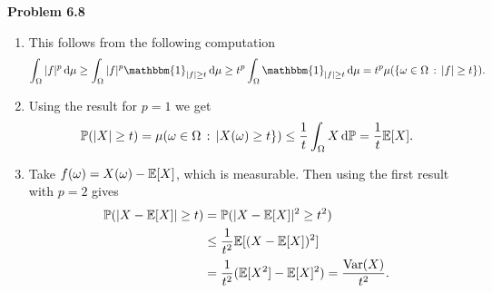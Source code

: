 \bigskip

\textbf{Problem 6.8}

\begin{enumerate}[label=(\alph*)]
\item This follows from the following computation
\[
	\int_\Omega |f|^p \, \dd \mu \ge \int_{\Omega} |f|^p \mathbbm{1}_{|f| \ge t} \, \dd \mu
	\ge t^p \int_\Omega \mathbbm{1}_{|f| \ge t} \, \dd \mu
	= t^p \mu(\{\omega \in \Omega \, : \, |f| \ge t\}).
\]
\item Using the result for $p = 1$ we get
\[
	\mathbb P(|X| \ge t) = \mu(\omega \in \Omega \, : \, |X(\omega) \ge t \})
	\le \frac{1}{t} \int_{\Omega} X \, \mathrm{d} \mathbb P = \frac{1}{t} \mathbb E[X].
\]
\item Take $f(\omega) = X(\omega) - \mathbb E[X]$, which is measurable. Then using the first result with $p = 2$ gives
\begin{align*}
	\mathbb P(|X - \mathbb E[X]| \ge t) &= \mathbb P(|X-\mathbb E[X]|^2 \ge t^2) \\
	&\le \frac{1}{t^2} \mathbb E[(X - \mathbb E[X])^2] \\
	&= \frac{1}{t^2} (\mathbb E[X^2] - \mathbb E[X]^2) = \frac{\mathrm{Var}(X)}{t^2}.
\end{align*}
\end{enumerate}


%
%
